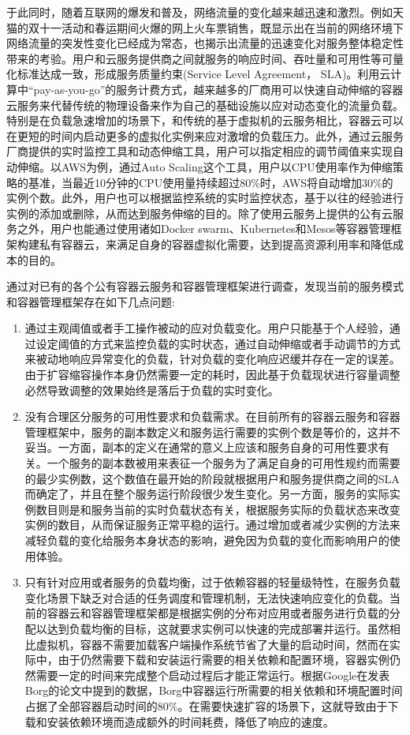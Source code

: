 于此同时，随着互联网的爆发和普及，网络流量的变化越来越迅速和激烈。例如天猫的双十一活动和春运期间火爆的网上火车票销售，既显示出在当前的网络环境下网络流量的突发性变化已经成为常态，也揭示出流量的迅速变化对服务整体稳定性带来的考验。用户和云服务提供商之间就服务的响应时间、吞吐量和可用性等可量化标准达成一致，形成服务质量约束(Service Level Agreement， SLA)\cite{patel2009service}。利用云计算中“pay-as-you-go”的服务计费方式\cite{armbrust2010view}，越来越多的厂商用可以快速自动伸缩的容器云服务来代替传统的物理设备来作为自己的基础设施以应对动态变化的流量负载。特别是在负载急速增加的场景下，和传统的基于虚拟机的云服务相比，容器云可以在更短的时间内启动更多的虚拟化实例来应对激增的负载压力。此外，通过云服务厂商提供的实时监控工具和动态伸缩工具，用户可以指定相应的调节阈值来实现自动伸缩。以AWS为例，通过Auto Scaling这个工具，用户以CPU使用率作为伸缩策略的基准，当最近10分钟的CPU使用量持续超过80\%时，AWS将自动增加30\%的实例个数。此外，用户也可以根据监控系统的实时监控状态，基于以往的经验进行实例的添加或删除，从而达到服务伸缩的目的。除了使用云服务上提供的公有云服务之外，用户也能通过使用诸如Docker swarm、Kubernetes和Mesos等容器管理框架构建私有容器云，来满足自身的容器虚拟化需要，达到提高资源利用率和降低成本的目的。

通过对已有的各个公有容器云服务和容器管理框架进行调查，发现当前的服务模式和容器管理框架存在如下几点问题:
\begin{enumerate}
\item 通过主观阈值或者手工操作被动的应对负载变化。用户只能基于个人经验，通过设定阈值的方式来监控负载的实时状态，通过自动伸缩或者手动调节的方式来被动地响应异常变化的负载，针对负载的变化响应迟缓并存在一定的误差。由于扩容缩容操作本身仍然需要一定的耗时，因此基于负载现状进行容量调整必然导致调整的效果始终是落后于负载的实时变化。
\item 没有合理区分服务的可用性要求和负载需求。在目前所有的容器云服务和容器管理框架中，服务的副本数定义和服务运行需要的实例个数是等价的，这并不妥当。一方面，副本的定义在通常的意义上应该和服务自身的可用性要求有关。一个服务的副本数被用来表征一个服务为了满足自身的可用性规约而需要的最少实例数，这个数值在最开始的阶段就根据用户和服务提供商之间的SLA而确定了，并且在整个服务运行阶段很少发生变化\cite{beyer2016site}。另一方面，服务的实际实例数目则是和服务当前的实时负载状态有关，根据服务实际的负载状态来改变实例的数目，从而保证服务正常平稳的运行。通过增加或者减少实例的方法来减轻负载的变化给服务本身状态的影响，避免因为负载的变化而影响用户的使用体验。
\item 只有针对应用或者服务的负载均衡，过于依赖容器的轻量级特性，在服务负载变化场景下缺乏对合适的任务调度和管理机制，无法快速响应变化的负载。当前的容器云和容器管理框架都是根据实例的分布对应用或者服务进行负载的分配以达到负载均衡的目标，这就要求实例可以快速的完成部署并运行。虽然相比虚拟机，容器不需要加载客户端操作系统节省了大量的启动时间，然而在实际中，由于仍然需要下载和安装运行需要的相关依赖和配置环境，容器实例仍然需要一定的时间来完成整个启动过程后才能正常运行。根据Google在发表Borg的论文中提到的数据，Borg中容器运行所需要的相关依赖和环境配置时间占据了全部容器启动时间的80\%\cite{verma2015large}。在需要快速扩容的场景下，这就导致由于下载和安装依赖环境而造成额外的时间耗费，降低了响应的速度。
\end{enumerate}


